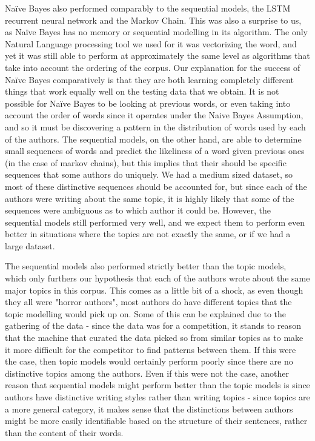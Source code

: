 \documentclass{article}
\begin{document}
Na\"ive Bayes also performed comparably to the sequential models, the LSTM recurrent neural network and the Markov Chain. This was also a surprise to us, as Na\"ive Bayes has no memory or sequential modelling in its algorithm. The only Natural Language processing tool we used for it was vectorizing the word, and yet it was still able to perform at approximately the same level as algorithms that take into account the ordering of the corpus. Our explanation for the success of Na\"ive Bayes comparatively is that they are both learning completely different things that work equally well on the testing data that we obtain. It is not possible for Na\"ive Bayes to be looking at previous words, or even taking into account the order of words since it operates under the Naive Bayes Assumption, and so it must be discovering a pattern in the distribution of words used by each of the authors. The sequential models, on the other hand, are able to determine small sequences of words and predict the likeliness of a word given previous ones (in the case of markov chains), but this implies that their should be specific sequences that some authors do uniquely. We had a medium sized dataset, so most of these distinctive sequences should be accounted for, but since each of the authors were writing about the same topic, it is highly likely that some of the sequences were ambiguous as to which author it could be. However, the sequential models still performed very well, and we expect them to perform even better in situations where the topics are not exactly the same, or if we had a large dataset. 

The sequential models also performed strictly better than the topic models, which only furthers our hypothesis that each of the authors wrote about the same major topics in this corpus. This comes as a little bit of a shock, as even though they all were "horror authors", most authors do have different topics that the topic modelling would pick up on. Some of this can be explained due to the gathering of the data - since the data was for a competition, it stands to reason that the machine that curated the data picked so from similar topics as to make it more difficult for the competitor to find patterns between them. If this were the case, then topic models would certainly perform poorly since there are no distinctive topics among the authors. Even if this were not the case, another reason that sequential models might perform better than the topic models is since authors have distinctive writing styles rather than writing topics - since topics are a more general category, it makes sense that the distinctions between authors might be more easily identifiable based on the structure of their sentences, rather than the content of their words. 
\end{document}

